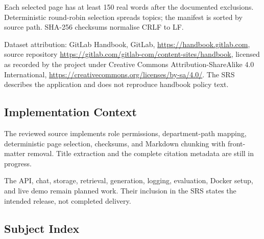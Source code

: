 \documentclass[11pt,letterpaper]{article}
\begin{document}
\endgroup

Each selected page has at least 150 real words after the documented exclusions. Deterministic round-robin selection spreads topics; the manifest is sorted by source path. SHA-256 checksums normalise CRLF to LF.\par

Dataset attribution: GitLab Handbook, GitLab, \url{https://handbook.gitlab.com}, source repository \url{https://gitlab.com/gitlab-com/content-sites/handbook}, licensed as recorded by the project under Creative Commons Attribution-ShareAlike 4.0 International, \url{https://creativecommons.org/licenses/by-sa/4.0/}. The SRS describes the application and does not reproduce handbook policy text.\par

\subsection{Implementation Context}

The reviewed source implements role permissions, department-path mapping, deterministic page selection, checksums, and Markdown chunking with front-matter removal. Title extraction and the complete citation metadata are still in progress.\par

The API, chat, storage, retrieval, generation, logging, evaluation, Docker setup, and live demo remain planned work. Their inclusion in the SRS states the intended release, not completed delivery.\par

\clearpage
\subsection{Subject Index}

\begingroup\small
\end{document}
